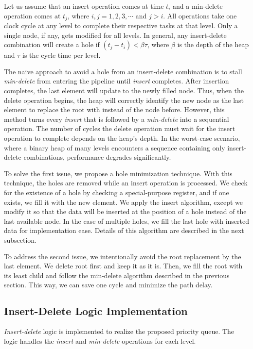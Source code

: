 \documentclass[10pt, conference, compsocconf]{IEEEtran}
\begin{document}
Let us assume that an insert operation comes at time $t_i$ and a min-delete operation comes at $t_j$, where $i, j = 1,2,3, \cdots$ and $j>i$.
All operations take one clock cycle at any level to complete their respective tasks at that level.
Only a single node, if any, gets modified for all levels.
In general, any insert-delete combination will create a hole if $(t_j - t_i) < \beta\tau$, where $\beta$ is the depth of the heap and $\tau$ is the cycle time per level.

The naive approach to avoid a hole from an insert-delete combination is to stall {\it min-delete} from entering the pipeline until {\it insert} completes.
After insertion completes, the last element will update to the newly filled node.
Thus, when the delete operation begins, the heap will correctly identify the new node as the last element to replace the root with instead of the node before.
However, this method turns every {\it insert} that is followed by a {\it min-delete} into a sequential operation.
The number of cycles the delete operation must wait for the insert operation to complete depends on the heap's depth.
In the worst-case scenario, where a binary heap of many levels encounters a sequence containing only insert-delete combinations, performance degrades significantly.

To solve the first issue, we propose a hole minimization technique.
With this technique, the holes are removed while an insert operation is processed.
We check for the existence of a hole by checking a special-purpose register, and if one exists, we fill it with the new element.
We apply the insert algorithm, except we modify it so that the data will be inserted at the position of a hole instead of the last available node.
In the case of multiple holes, we fill the last hole with inserted data for implementation ease.
Details of this algorithm are described in the next subsection.

To address the second issue, we intentionally avoid the root replacement by the last element.
We delete root first and keep it as it is.
Then, we fill the root with its least child and follow the min-delete algorithm described in the previous section.
This way, we can save one cycle and minimize the path delay.

\subsection{Insert-Delete Logic Implementation}

{\it Insert-delete} logic is implemented to realize the proposed priority queue.
The logic handles the {\it insert} and {\it min-delete} operations for each level.
\end{document}

